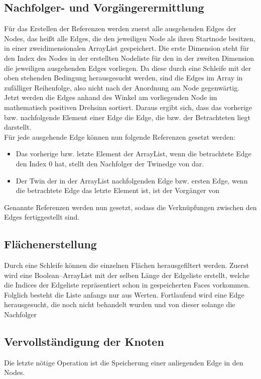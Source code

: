 \subsection{Nachfolger- und Vorgängerermittlung}
Für das Erstellen der Referenzen werden zuerst alle ausgehenden Edges der Nodes, das heißt alle Edges, die den jeweiligen Node als ihren Startnode besitzen, in einer zweidimensionalen ArrayList gespeichert.
Die erste Dimension steht für den Index des Nodes in der erstellten Nodeliste für den in der zweiten Dimension die jeweiligen ausgehenden Edges vorliegen.
Da diese durch eine  Schleife mit der oben stehenden Bedingung herausgesucht werden, sind die Edges im Array in zufälliger Reihenfolge, also nicht nach der Anordnung am Node gegenwärtig.
Jetzt werden die Edges anhand des  Winkel am vorliegenden Node im mathematisch positiven Drehsinn sortiert.
Daraus ergibt sich, dass das vorherige bzw. nachfolgende Element einer Edge die Edge, die  bzw.  der Betrachteten liegt darstellt.\\
Für jede ausgehende Edge  können nun folgende Referenzen gesetzt werden:
\begin{itemize}
	\item Das vorherige bzw. letzte Element der ArrayList, wenn die betrachtete Edge den Index 0 hat, stellt den Nachfolger der Twinedge von  dar.
	\item Der Twin der in der ArrayList nachfolgenden Edge bzw. ersten Edge, wenn die betrachtete Edge das letzte Element ist, ist der Vorgänger von 
\end{itemize}
Genannte Referenzen werden nun gesetzt, sodass die Verknüpfungen zwischen den Edges fertiggestellt sind.
\subsection{Flächenerstellung}
Durch eine Schleife können die einzelnen Flächen herausgefiltert werden.
Zuerst wird eine Boolean--ArrayList mit der selben Länge der Edgeliste erstellt, welche die Indices der Edgeliste repräsentiert schon in gespeicherten Faces vorkommen.
Folglich besteht die Liste anfangs nur aus  Werten.
Fortlaufend wird eine Edge herausgesucht, die noch nicht behandelt wurden und von dieser solange die Nachfolger 


\subsection{Vervollständigung der Knoten}
Die letzte nötige Operation ist die Speicherung einer anliegenden Edge in den Nodes.